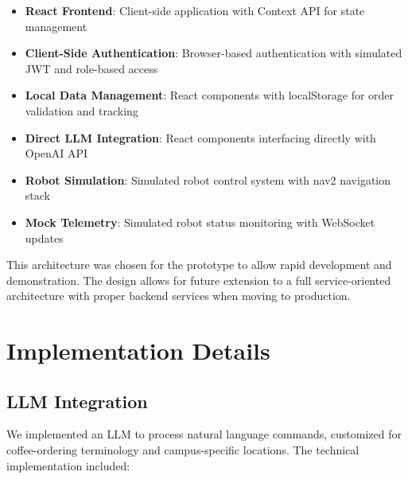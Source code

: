 \documentclass[12pt]{article}
\begin{document}
\begin{itemize}
    \item \textbf{React Frontend}: Client-side application with Context API for state management
    \item \textbf{Client-Side Authentication}: Browser-based authentication with simulated JWT and role-based access
    \item \textbf{Local Data Management}: React components with localStorage for order validation and tracking
    \item \textbf{Direct LLM Integration}: React components interfacing directly with OpenAI API
    \item \textbf{Robot Simulation}: Simulated robot control system with nav2 navigation stack
    \item \textbf{Mock Telemetry}: Simulated robot status monitoring with WebSocket updates
\end{itemize}

This architecture was chosen for the prototype to allow rapid development and demonstration. The design allows for future extension to a full service-oriented architecture with proper backend services when moving to production.

\section{Implementation Details}

\subsection{LLM Integration}

We implemented an LLM to process natural language commands, customized for coffee-ordering terminology and campus-specific locations. The technical implementation included:
\end{document}
